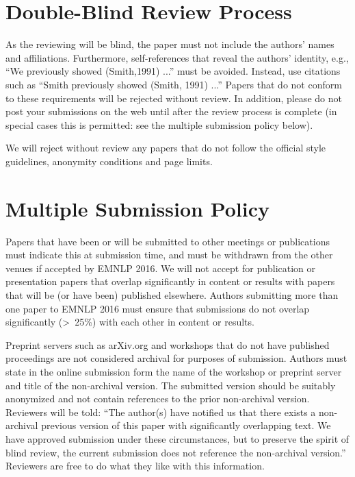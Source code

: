 \documentclass[11pt,letterpaper]{article}
\begin{document}
\section{Double-Blind Review Process}
\label{sec:blind}

As the reviewing will be blind, the paper must not include the authors' names and
affiliations.  Furthermore, self-references that reveal the authors' identity,
e.g., ``We previously showed (Smith,1991) ...'' must be avoided. Instead, use
citations such as ``Smith previously showed (Smith, 1991) ...'' Papers that do
not conform to these requirements will be rejected without review. In addition,
please do not post your submissions on the web until after the review process is
complete (in special cases this is permitted: see the multiple submission policy
below).

We will reject without review any papers that do not follow the official style
guidelines, anonymity conditions and page limits.

\section{Multiple Submission Policy}

Papers that have been or will be submitted to other meetings or publications must
indicate this at submission time, and must be withdrawn from the other venues if
accepted by EMNLP 2016. We will not accept for publication or presentation papers
that overlap significantly in content or results with papers that will be (or
have been) published elsewhere. Authors submitting more than one paper to EMNLP
2016 must ensure that submissions do not overlap significantly (\textgreater~25\%) with
each other in content or results.

Preprint servers such as arXiv.org and workshops that do not have
published proceedings are not considered
archival for purposes of submission. Authors must state in the online submission
form the name of the workshop or preprint server and title of the non-archival
version. The submitted version should be suitably anonymized and not contain
references to the prior non-archival version. Reviewers will be told: ``The
author(s) have notified us that there exists a non-archival previous version of
this paper with significantly overlapping text. We have approved submission under
these circumstances, but to preserve the spirit of blind review, the current
submission does not reference the non-archival version.'' Reviewers are free to do
what they like with this information.
\end{document}

